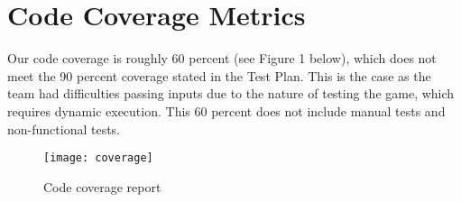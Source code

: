 \documentclass[12pt, titlepage]{article}
\begin{document}
\section{Code Coverage Metrics}
 Our code coverage is roughly 60 percent (see Figure 1 below), which does not meet the 90 percent coverage stated in the Test Plan. This is the case as the team had difficulties passing inputs due to the nature of testing the game, which requires dynamic execution. This 60 percent does not include manual tests and non-functional tests. 


\begin{figure}[h!]
    \centering
    \texttt{[image: coverage]}
    \caption{Code coverage report}
    \label{fig:my_label}
\end{figure}







\end{document}
